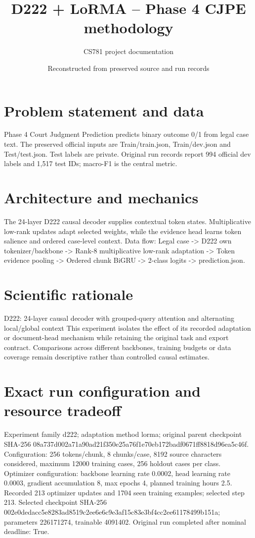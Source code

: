 \documentclass[11pt,a4paper]{article}
\begin{document}
\title{D222 + LoRMA -- Phase 4 CJPE methodology}
\author{CS781 project documentation}
\date{Reconstructed from preserved source and run records}
\maketitle
\section{Problem statement and data}
Phase 4 Court Judgment Prediction predicts binary outcome 0/1 from legal case text. The preserved official inputs are Train/train.json, Train/dev.json and Test/test.json. Test labels are private. Original run records report 994 official dev labels and 1,517 test IDs; macro-F1 is the central metric.
\section{Architecture and mechanics}
The 24-layer D222 causal decoder supplies contextual token states. Multiplicative low-rank updates adapt selected weights, while the evidence head learns token salience and ordered case-level context. Data flow: Legal case -> D222 own tokenizer/backbone -> Rank-8 multiplicative low-rank adaptation -> Token evidence pooling -> Ordered chunk BiGRU -> 2-class logits -> prediction.json.
\section{Scientific rationale}
D222: 24-layer causal decoder with grouped-query attention and alternating local/global context This experiment isolates the effect of its recorded adaptation or document-head mechanism while retaining the original task and export contract. Comparisons across different backbones, training budgets or data coverage remain descriptive rather than controlled causal estimates.
\section{Exact run configuration and resource tradeoff}
Experiment family d222; adaptation method lorma; original parent checkpoint SHA-256 08a737d002a71a90ad21f350e25a76f1e70eb172badf0671ff8818d96ea5c46f. Configuration: 256 tokens/chunk, 8 chunks/case, 8192 source characters considered, maximum 12000 training cases, 256 holdout cases per class. Optimizer configuration: backbone learning rate 0.0002, head learning rate 0.0003, gradient accumulation 8, max epochs 4, planned training hours 2.5. Recorded 213 optimizer updates and 1704 seen training examples; selected step 213. Selected checkpoint SHA-256 002e0dedacc5e8283ad8519c2ee6e6c9e3af15c83e3bf4cc2ee61178499b151a; parameters 226171274, trainable 4091402. Original run completed after nominal deadline: True.
\end{document}

